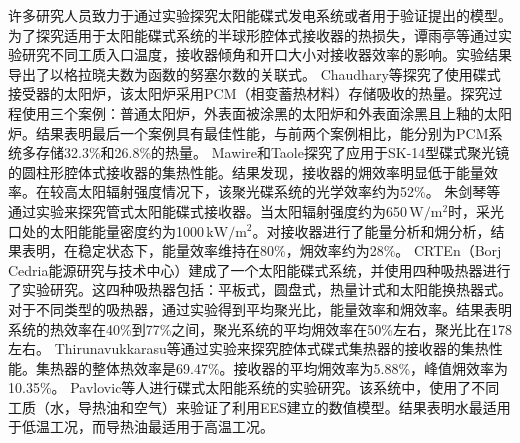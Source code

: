 许多研究人员致力于通过实验探究太阳能碟式发电系统或者用于验证提出的模型。
为了探究适用于太阳能碟式系统的半球形腔体式接收器的热损失，谭雨亭等\cite{Tan2014b}通过实验研究不同工质入口温度，接收器倾角和开口大小对接收器效率的影响。实验结果导出了以格拉晓夫数为函数的努塞尔数的关联式。
Chaudhary等\cite{Chaudhary2013}探究了使用碟式接受器的太阳炉，该太阳炉采用PCM（相变蓄热材料）存储吸收的热量。探究过程使用三个案例：普通太阳炉，外表面被涂黑的太阳炉和外表面涂黑且上釉的太阳炉。结果表明最后一个案例具有最佳性能，与前两个案例相比，能分别为PCM系统多存储32.3\%和26.8\%的热量。
Mawire和Taole\cite{Mawire2014}探究了应用于SK-14型碟式聚光镜的圆柱形腔体式接收器的集热性能。结果发现，接收器的㶲效率明显低于能量效率。在较高太阳辐射强度情况下，该聚光碟系统的光学效率约为52\%。
朱剑琴等\cite{Zhu2015}通过实验来探究管式太阳能碟式接收器。当太阳辐射强度约为650$\,\mathrm{W/m^2}$时，采光口处的太阳能能量密度约为1000$\,\mathrm{kW/m^2}$。对接收器进行了能量分析和㶲分析，结果表明，在稳定状态下，能量效率维持在80\%，㶲效率约为28\%。
CRTEn（Borj Cedria能源研究与技术中心）建成了一个太阳能碟式系统，并使用四种吸热器进行了实验研究。这四种吸热器包括：平板式，圆盘式，热量计式和太阳能换热器式。对于不同类型的吸热器，通过实验得到平均聚光比，能量效率和㶲效率。结果表明系统的热效率在40\%到77\%之间，聚光系统的平均㶲效率在50\%左右，聚光比在178左右。
Thirunavukkarasu等\cite{Thirunavukkarasu2017}通过实验来探究腔体式碟式集热器的接收器的集热性能。集热器的整体热效率是69.47\%。接收器的平均㶲效率为5.88\%，峰值㶲效率为10.35\%。
Pavlovic等人\cite{Pavlovic2017}进行碟式太阳能系统的实验研究。该系统中，使用了不同工质（水，导热油和空气）来验证了利用EES建立的数值模型。结果表明水最适用于低温工况，而导热油最适用于高温工况。

